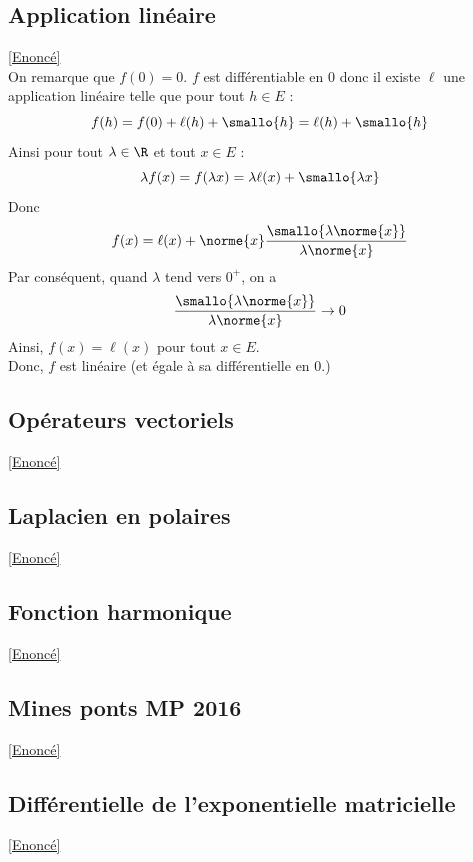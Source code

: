 \documentclass{book}
\begin{document}
	\subsection{Application linéaire}
	\label{sec:application-lineaire}
	\textcolor{blue}{\hyperref[Application linéaire]{[Enoncé]}}\\
		On remarque que $f(0)=0$.
		$f$ est différentiable en $0$ donc il existe $\ell$ une application linéaire telle que pour tout $h\in E$ : 
		\[f(h)=f(0)+\ell(h)+\smallo{h}=\ell(h)+\smallo{h}\]
		Ainsi pour tout $\lambda\in\R$ et tout $x\in E$ :
			\[\lambda f(x)=f(\lambda x)=\lambda\ell(x)+\smallo{\lambda x}\]
		Donc \[f(x)=\ell(x)+\norme{x}\frac{\smallo{\lambda\norme{x}}}{\lambda\norme{x}}\]
		Par conséquent, quand $\lambda$ tend vers $0^+$, on a \[\frac{\smallo{\lambda\norme{x}}}{\lambda\norme{x}}\to 0\]
		Ainsi, $f(x)=\ell(x)$ pour tout $x\in E$.\\
		Donc, $f$ est linéaire (et égale à sa différentielle en $0$.)
	\subsection{Opérateurs vectoriels}\label{sec:operateurs-vectoriels}
		\textcolor{blue}{\hyperref[Opérateurs vectoriels]{[Enoncé]}}\\
	\subsection{Laplacien en polaires}\label{sec:laplacien-en-polaires}
		\textcolor{blue}{\hyperref[Laplacien en polaires]{[Enoncé]}}\\
	
	\subsection{Fonction harmonique}\label{sec:fonction-harmonique}
		\textcolor{blue}{\hyperref[Fonction harmoinique]{[Enoncé]}}\\
	
	\subsection{Mines ponts MP 2016}\label{sec:mines-ponts-mp-2016}
		\textcolor{blue}{\hyperref[Mines ponts MP 2016]{[Enoncé]}}\\
	
	\subsection{Différentielle de l'exponentielle matricielle}\label{sec:differentielle-de-lexponentielle-matricielle}
		\textcolor{blue}{\hyperref[Différentielle de l'exponentielle matricielle]{[Enoncé]}}\\
	
\end{document}
